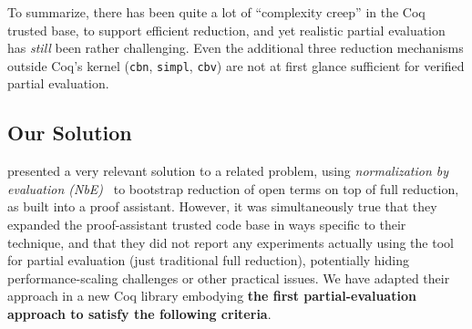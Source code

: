 
To summarize, there has been quite a lot of ``complexity creep'' in the Coq trusted base, to support efficient reduction, and yet realistic partial evaluation has \emph{still} been rather challenging.
Even the additional three reduction mechanisms outside Coq's kernel (\texttt{cbn}, \texttt{simpl}, \texttt{cbv}) are not at first glance sufficient for verified partial evaluation.


\subsection{Our Solution} \label{sec:our-solution}

\textcite{Aehlig} presented a very relevant solution to a related problem, using \emph{normalization by evaluation (NbE)}~\cite{NbE} to bootstrap reduction of open terms on top of full reduction, as built into a proof assistant.
However, it was simultaneously true that they expanded the proof-assistant trusted code base in ways specific to their technique, and that they did not report any experiments actually using the tool for partial evaluation (just traditional full reduction), potentially hiding performance-scaling challenges or other practical issues.
We have adapted their approach in a new Coq library embodying \textbf{the first partial-evaluation approach to satisfy the following criteria}.

